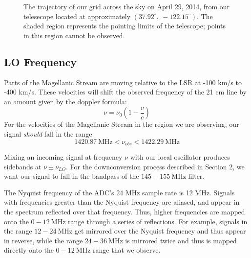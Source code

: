\documentclass[12pt]{article}
\begin{document}
\begin{figure}[H]
\caption[SODUMB]{The trajectory of our grid across the sky on April 29, 2014, from our telesecope located at approximately $\mathrm{(37.92^\circ,\ -122.15^\circ)}$. The shaded region represents the pointing limits of the telescope; points in this region cannot be observed.
}
\label{fig:whatsup}
\end{figure}

\subsection*{LO Frequency}

Parts of the Magellanic Stream are moving relative to the LSR at -100 km/s to -400 km/s. These velocities will shift the observed frequency of the 21 cm line by an amount given by the doppler formula:
\begin{equation}
\nu = \nu_0 \left( 1 - \frac{v}{c} \right) \label{eq:doppler}
\end{equation}
For the velocities of the Magellanic Stream in the region we are observing, our signal \textit{should} fall in the range
\begin{equation}
1420.87\ \mathrm{MHz}< {\nu_{obs}} < 1422.29\ \mathrm{MHz} \label{eq:expected-freqs}
\end{equation}

Mixing an incoming signal at frequency $\nu$ with our local oscillator produces sidebands at $\nu \pm \nu_{LO}$. For the downconversion process described in Section 2, we want our signal to fall in the bandpass of the $145-155\ \mathrm{MHz}$ filter.

The Nyquist frequency of the ADC's 24 MHz sample rate is 12 MHz. Signals with frequencies greater than the Nyquist frequency are aliased, and appear in the spectrum reflected over that frequency. Thus, higher frequencies are mapped onto the $0-12\ \mathrm{MHz}$ range through a series of reflections. For example, signals in the range $12-24\ \mathrm{MHz}$ get mirrored over the Nyquist frequency and thus appear in reverse, while the range $24-36\ \mathrm{MHz}$ is mirrored twice and thus is mapped directly onto the $0-12\ \mathrm{MHz}$ range that we observe.
\end{document}
